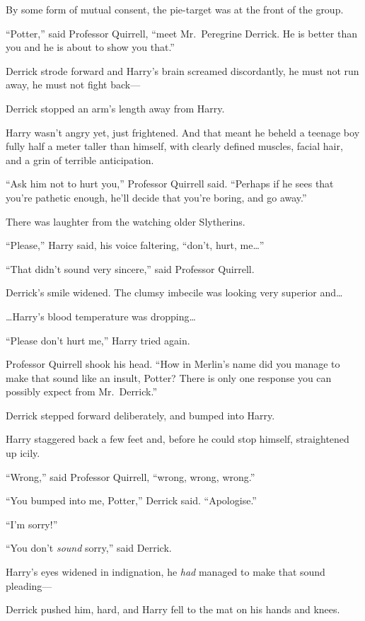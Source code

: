 By some form of mutual consent, the pie-target was at the front of the
group.

``Potter,'' said Professor Quirrell, ``meet Mr.~Peregrine Derrick. He is
better than you and he is about to show you that.''

Derrick strode forward and Harry's brain screamed discordantly, he must
not run away, he must not fight back---

Derrick stopped an arm's length away from Harry.

Harry wasn't angry yet, just frightened. And that meant he beheld a
teenage boy fully half a meter taller than himself, with clearly defined
muscles, facial hair, and a grin of terrible anticipation.

``Ask him not to hurt you,'' Professor Quirrell said. ``Perhaps if he
sees that you're pathetic enough, he'll decide that you're boring, and
go away.''

There was laughter from the watching older Slytherins.

``Please,'' Harry said, his voice faltering, ``don't, hurt, me\ldots{}''

``That didn't sound very sincere,'' said Professor Quirrell.

Derrick's smile widened. The clumsy imbecile was looking very superior
and\ldots{}

\ldots{}Harry's blood temperature was dropping\ldots{}

``Please don't hurt me,'' Harry tried again.

Professor Quirrell shook his head. ``How in Merlin's name did you manage
to make that sound like an insult, Potter? There is only one response
you can possibly expect from Mr.~Derrick.''

Derrick stepped forward deliberately, and bumped into Harry.

Harry staggered back a few feet and, before he could stop himself,
straightened up icily.

``Wrong,'' said Professor Quirrell, ``wrong, wrong, wrong.''

``You bumped into me, Potter,'' Derrick said. ``Apologise.''

``I'm sorry!''

``You don't \emph{sound} sorry,'' said Derrick.

Harry's eyes widened in indignation, he \emph{had} managed to make that
sound pleading---

Derrick pushed him, hard, and Harry fell to the mat on his hands and
knees.

